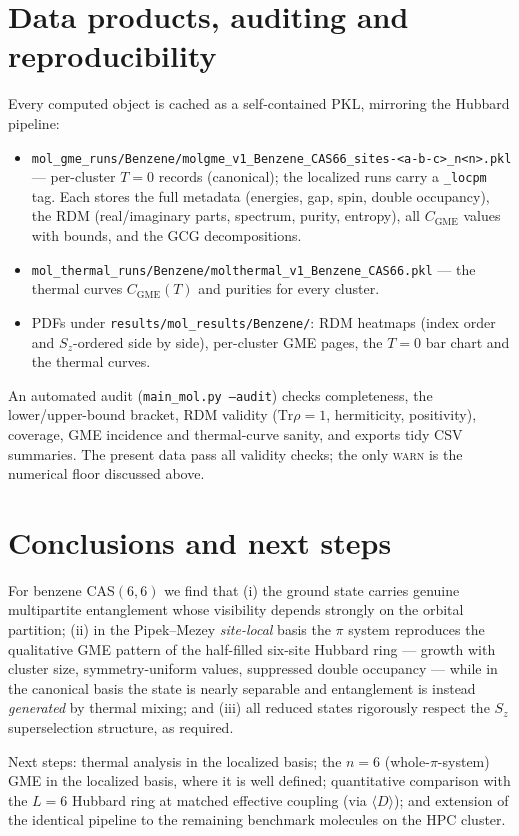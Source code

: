 \documentclass[11pt]{article}
\newcommand{\code}[1]{\texttt{\small #1}}
\newcommand{\CGME}{\ensuremath{C_{\mathrm{GME}}}}
\begin{document}
\section{Data products, auditing and reproducibility}\label{sec:saved}
Every computed object is cached as a self-contained PKL, mirroring the Hubbard
pipeline:
\begin{itemize}[nosep]
  \item \code{mol\_gme\_runs/Benzene/molgme\_v1\_Benzene\_CAS66\_sites-<a-b-c>\_n<n>.pkl}
        --- per-cluster $T{=}0$ records (canonical); the localized runs carry a
        \code{\_locpm} tag. Each stores the full metadata (energies, gap, spin,
        double occupancy), the RDM (real/imaginary parts, spectrum, purity,
        entropy), all \CGME{} values with bounds, and the GCG decompositions.
  \item \code{mol\_thermal\_runs/Benzene/molthermal\_v1\_Benzene\_CAS66.pkl}
        --- the thermal curves $\CGME(T)$ and purities for every cluster.
  \item PDFs under \code{results/mol\_results/Benzene/}: RDM heatmaps (index
        order and $S_z$-ordered side by side), per-cluster GME pages, the
        $T{=}0$ bar chart and the thermal curves.
\end{itemize}
An automated audit (\code{main\_mol.py --audit}) checks completeness, the
lower/upper-bound bracket, RDM validity ($\mathrm{Tr}\rho=1$, hermiticity,
positivity), coverage, GME incidence and thermal-curve sanity, and exports tidy
CSV summaries. The present data pass all validity checks; the only
\textsc{warn} is the numerical floor discussed above.

\section{Conclusions and next steps}
For benzene CAS$(6,6)$ we find that (i) the ground state carries genuine
multipartite entanglement whose visibility depends strongly on the orbital
partition; (ii) in the Pipek--Mezey \emph{site-local} basis the $\pi$ system
reproduces the qualitative GME pattern of the half-filled six-site Hubbard
ring --- growth with cluster size, symmetry-uniform values, suppressed double
occupancy --- while in the canonical basis the state is nearly separable and
entanglement is instead \emph{generated} by thermal mixing; and (iii) all
reduced states rigorously respect the $S_z$ superselection structure, as
required.

Next steps: thermal analysis in the localized basis; the $n=6$
(whole-$\pi$-system) GME in the localized basis, where it is well defined;
quantitative comparison with the $L=6$ Hubbard ring at matched effective
coupling (via $\langle D\rangle$); and extension of the identical pipeline to
the remaining benchmark molecules on the HPC cluster.
\end{document}
